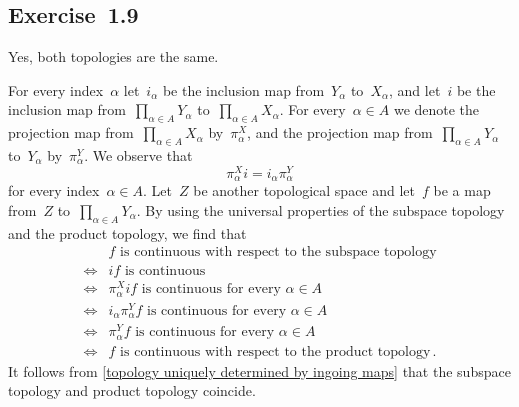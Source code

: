\subsection{Exercise~1.9}

Yes, both topologies are the same.

For every index~$α$ let~$i_α$ be the inclusion map from~$Y_α$ to~$X_α$, and let~$i$ be the inclusion map from~$∏_{α ∈ A} Y_α$ to~$∏_{α ∈ A} X_α$.
For every~$α ∈ A$ we denote the projection map from~$∏_{α ∈ A} X_α$ by~$π^X_α$, and the projection map from~$∏_{α ∈ A} Y_α$ to~$Y_α$ by~$π^Y_α$.
We observe that
\[
	π^X_α i = i_α π^Y_α
\]
for every index~$α ∈ A$.
Let~$Z$ be another topological space and let~$f$ be a map from~$Z$ to~$∏_{α ∈ A} Y_α$.
By using the universal properties of the subspace topology and the product topology, we find that
\begin{align*}
	{}&
	\text{$f$ is continuous with respect to the subspace topology}
	\\
	\iff{}&
	\text{$i f$ is continuous}
	\\
	\iff{}&
	\text{$π^X_α i f$ is continuous for every~$α ∈ A$}
	\\
	\iff{}&
	\text{$i_α π^Y_α f$ is continuous for every~$α ∈ A$}
	\\
	\iff{}&
	\text{$π^Y_α f$ is continuous for every~$α ∈ A$}
	\\
	\iff{}&
	\text{$f$ is continuous with respect to the product topology} \,.
\end{align*}
It follows from \cref{topology uniquely determined by ingoing maps} that the subspace topology and product topology coincide.

